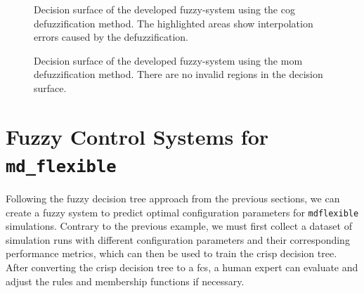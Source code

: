 \begin{multicols}{2}
\begin{figure}[H]
        \caption[Decision surface of the fuzzy rules using COG method]{Decision surface of the developed fuzzy-system using the \gls{cog} defuzzification method. The highlighted areas show interpolation errors caused by the defuzzification.}
        \label{fig:fuzzyDecisionSurfaceExampleCOG}
    \end{figure}

    \columnbreak

    \begin{figure}[H]
        \caption[Decision surface of the fuzzy rules using MOM method]{Decision surface of the developed fuzzy-system using the \gls{mom} defuzzification method. There are no invalid regions in the decision surface.}
        \label{fig:fuzzyDecisionSurfaceExampleMOM}
    \end{figure}
\end{multicols}


\section{Fuzzy Control Systems for \texttt{md\_flexible}}

Following the fuzzy decision tree approach from the previous sections, we can create a fuzzy system to predict optimal configuration parameters for \texttt{\gls{mdflexible}} simulations. Contrary to the previous example, we must first collect a dataset of simulation runs with different configuration parameters and their corresponding performance metrics, which can then be used to train the crisp decision tree. After converting the crisp decision tree to a \gls{fcs}, a human expert can evaluate and adjust the rules and membership functions if necessary.


